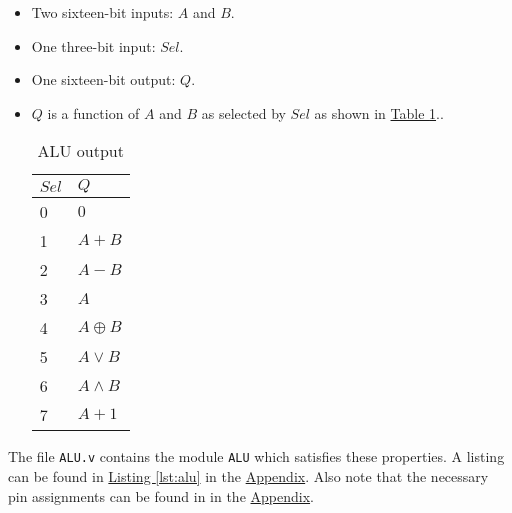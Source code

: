 \begin{itemize}
    \item Two sixteen-bit inputs: $A$ and $B$.
    \item One three-bit input: $Sel$.
    \item One sixteen-bit output: $Q$.
    \item $Q$ is a function of $A$ and $B$ as selected by $Sel$ as shown in \hyperref[tab:alu]{Table \ref*{tab:alu}}..
        \begin{table}[htbp]
            \center
            \begin{tabular}{ll}             \toprule
                $Sel$       & $Q$           \\\midrule
                0           & $0$           \\
                1           & $A + B$       \\
                2           & $A - B$       \\
                3           & $A$           \\
                4           & $A \oplus B$  \\
                5           & $A \lor B$    \\
                6           & $A \land B$   \\
                7           & $A + 1$       \\\bottomrule
            \end{tabular}
            \caption{ALU output}
            \label{tab:alu}
        \end{table}
\end{itemize}

The file \verb|ALU.v| contains the module \verb|ALU| which satisfies these properties.
A listing can be found in \hyperref[lst:alu]{Listing \ref*{lst:alu}} in the \hyperref[sec:appendix]{Appendix}.
Also note that the necessary pin assignments can be found in %
in the \hyperref[sec:appendix]{Appendix}.